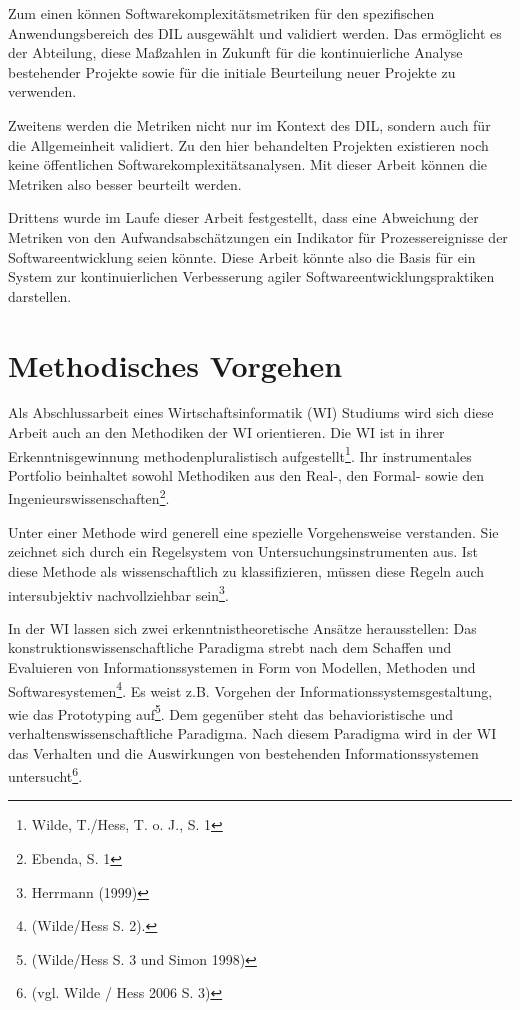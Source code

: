 Zum einen können Softwarekomplexitätsmetriken für den spezifischen
Anwendungsbereich des DIL ausgewählt und validiert werden. Das
ermöglicht es der Abteilung, diese Maßzahlen in Zukunft für die
kontinuierliche Analyse bestehender Projekte sowie für die initiale
Beurteilung neuer Projekte zu verwenden.

Zweitens werden die Metriken nicht nur im Kontext des DIL, sondern auch
für die Allgemeinheit validiert. Zu den hier behandelten Projekten
existieren noch keine öffentlichen Softwarekomplexitätsanalysen. Mit
dieser Arbeit können die Metriken also besser beurteilt werden.

Drittens wurde im Laufe dieser Arbeit festgestellt, dass eine Abweichung
der Metriken von den Aufwandsabschätzungen ein Indikator für
Prozessereignisse der Softwareentwicklung seien könnte. Diese Arbeit
könnte also die Basis für ein System zur kontinuierlichen Verbesserung
agiler Softwareentwicklungspraktiken darstellen.

\section{Methodisches Vorgehen}\label{methodisches-vorgehen}

Als Abschlussarbeit eines Wirtschaftsinformatik (WI) Studiums wird sich
diese Arbeit auch an den Methodiken der WI orientieren. Die WI ist in
ihrer Erkenntnisgewinnung methodenpluralistisch aufgestellt\footnote{Wilde,
  T./Hess, T. o. J., S. 1}. Ihr instrumentales Portfolio beinhaltet
sowohl Methodiken aus den Real-, den Formal- sowie den
Ingenieurswissenschaften\footnote{Ebenda, S. 1}.

Unter einer Methode wird generell eine spezielle Vorgehensweise
verstanden. Sie zeichnet sich durch ein Regelsystem von
Untersuchungsinstrumenten aus. Ist diese Methode als wissenschaftlich zu
klassifizieren, müssen diese Regeln auch intersubjektiv nachvollziehbar
sein\footnote{Herrmann (1999)}.

In der WI lassen sich zwei erkenntnistheoretische Ansätze herausstellen:
Das konstruktionswissenschaftliche Paradigma strebt nach dem Schaffen
und Evaluieren von Informationssystemen in Form von Modellen, Methoden
und Softwaresystemen\footnote{(Wilde/Hess S. 2).}. Es weist z.B.
Vorgehen der Informationssystemsgestaltung, wie das Prototyping
auf\footnote{(Wilde/Hess S. 3 und Simon 1998)}. Dem gegenüber steht das
behavioristische und verhaltenswissenschaftliche Paradigma. Nach diesem
Paradigma wird in der WI das Verhalten und die Auswirkungen von
bestehenden Informationssystemen untersucht\footnote{(vgl. Wilde / Hess
  2006 S. 3)}.

